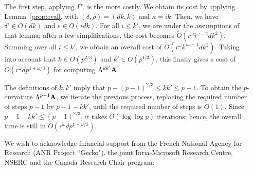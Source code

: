 \documentclass{sig-alternate}
\newcommand{\bigOsoft}{\tilde{O}}
\def\mA {\ensuremath{{\bf A}}}
\begin{document}
The first step, applying $\Gamma'$, is the more costly. We obtain its
cost by applying Lemma~\ref{prop:eval}, with $(\delta,\rho)=(dk,k)$
and $\kappa=ik$. Then, we have $\delta'\in O(dk)$ and $\varepsilon \in
O(idk)$. For all $i\le k'$, we are under the assumptions of that
lemma; after a few simplifications, the cost becomes
$\bigOsoft(r^\omega i^{\omega-2} d k^2)$. Summing over all $i \le k'$,
we obtain an overall cost of $\bigOsoft(r^\omega {k'}^{\omega-1} d
k^2)$.  Taking into account that $k\in O(p^{2/3})$ and $k'\in
O(p^{1/3})$, this finally gives a cost of $\bigOsoft(r^\omega d
p^{1+\omega/3})$ for computing $\Lambda^{kk'}\mA$.

\smallskip{} The definitions
of $k,k'$ imply that $p-(p-1)^{2/3} \le kk' \le p-1$. To obtain the
$p$-curvature $\Lambda^{p-1} \mA$, we iterate the previous process,
replacing the required number of steps $p-1$ by $p-1-kk'$, until the
required number of steps is $O(1)$. Since $p-1-kk' \le (p-1)^{2/3}$, it
takes $O(\log \log p)$ iterations; hence, the overall time is still in
$\bigOsoft(r^\omega d p^{1+\omega/3})$.

\smallskip{} We wish to acknowledge financial
support from the French National Agency for Research (ANR Project ``Gecko"),
the joint Inria-Microsoft Research Centre, NSERC and the Canada Research Chair
program.

\smallskip


\end{document}
